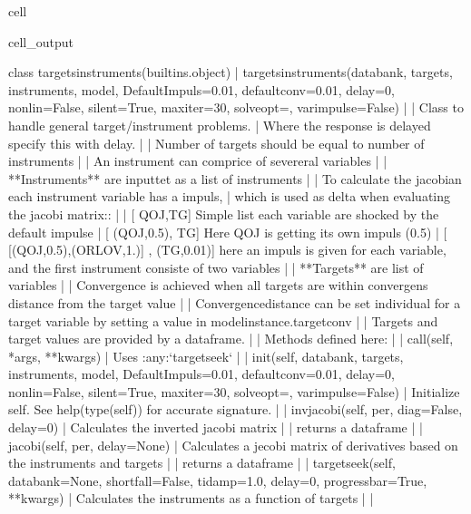 \documentclass[letterpaper,10pt,english]{jupyterBook}
\begin{document}
\begin{sphinxuseclass}{cell}
\begin{sphinxVerbatimOutput}
\begin{sphinxuseclass}{cell_output}
\begin{sphinxVerbatim}[commandchars=\\\{\}]
class targets\PYGZus{}instruments(builtins.object)
 |  targets\PYGZus{}instruments(databank, targets, instruments, model, DefaultImpuls=0.01, defaultconv=0.01, delay=0, nonlin=False, silent=True, maxiter=30, solveopt=\PYGZob{}\PYGZcb{}, varimpulse=False)
 |  
 |  Class to handle general target/instrument problems. 
 |  Where the response is delayed specify this with delay.
 |  
 |  Number of targets should be equal to number of instruments 
 |  
 |  An instrument can comprice of severeral variables
 |  
 |  **Instruments** are inputtet as a list of instruments
 |  
 |  To calculate the jacobian each instrument variable has a impuls, 
 |  which is used as delta when evaluating the jacobi matrix:: 
 |      
 |    [ \PYGZsq{}QO\PYGZus{}J\PYGZsq{},\PYGZsq{}TG\PYGZsq{}]   Simple list each variable are shocked by the default impulse 
 |    [ (\PYGZsq{}QO\PYGZus{}J\PYGZsq{},0.5), \PYGZsq{}TG\PYGZsq{}]  Here QO\PYGZus{}J is getting its own impuls (0.5)
 |    [ [(\PYGZsq{}QO\PYGZus{}J\PYGZsq{},0.5),(\PYGZsq{}ORLOV\PYGZsq{},1.)] , (\PYGZsq{}TG\PYGZsq{},0.01)] here an impuls is given for each variable, and the first instrument consiste of two variables 
 |  
 |  **Targets** are list of variables
 |  
 |  Convergence is achieved when all targets are within convergens distance from the target value
 |  
 |  Convergencedistance can be set individual for a target variable by setting a value in \PYGZlt{}modelinstance\PYGZgt{}.targetconv 
 |  
 |  Targets and target values are provided by a dataframe.
 |  
 |  Methods defined here:
 |  
 |  \PYGZus{}\PYGZus{}call\PYGZus{}\PYGZus{}(self, *args, **kwargs)
 |      Uses :any:`targetseek`
 |  
 |  \PYGZus{}\PYGZus{}init\PYGZus{}\PYGZus{}(self, databank, targets, instruments, model, DefaultImpuls=0.01, defaultconv=0.01, delay=0, nonlin=False, silent=True, maxiter=30, solveopt=\PYGZob{}\PYGZcb{}, varimpulse=False)
 |      Initialize self.  See help(type(self)) for accurate signature.
 |  
 |  invjacobi(self, per, diag=False, delay=0)
 |      Calculates the inverted jacobi matrix
 |      
 |      returns a dataframe
 |  
 |  jacobi(self, per, delay=None)
 |      Calculates a jecobi matrix of derivatives based on the instruments and targets 
 |      
 |      returns a dataframe
 |  
 |  targetseek(self, databank=None, shortfall=False, ti\PYGZus{}damp=1.0, delay=0, progressbar=True, **kwargs)
 |      Calculates the instruments as a function of targets
 |  
 |  \PYGZhy{}\PYGZhy{}\PYGZhy{}\PYGZhy{}\PYGZhy{}\PYGZhy{}\PYGZhy{}\PYGZhy{}\PYGZhy{}\PYGZhy{}\PYGZhy{}\PYGZhy{}\PYGZhy{}\PYGZhy{}\PYGZhy{}\PYGZhy{}\PYGZhy{}\PYGZhy{}\PYGZhy{}\PYGZhy{}\PYGZhy{}\PYGZhy{}\PYGZhy{}\PYGZhy{}\PYGZhy{}\PYGZhy{}\PYGZhy{}\PYGZhy{}\PYGZhy{}\PYGZhy{}\PYGZhy{}\PYGZhy{}\PYGZhy{}\PYGZhy{}\PYGZhy{}\PYGZhy{}\PYGZhy{}\PYGZhy{}\PYGZhy{}\PYGZhy{}\PYGZhy{}\PYGZhy{}\PYGZhy{}\PYGZhy{}\PYGZhy{}\PYGZhy{}\PYGZhy{}\PYGZhy{}\PYGZhy{}\PYGZhy{}\PYGZhy{}\PYGZhy{}\PYGZhy{}\PYGZhy{}\PYGZhy{}\PYGZhy{}\PYGZhy{}\PYGZhy{}\PYGZhy{}\PYGZhy{}\PYGZhy{}\PYGZhy{}\PYGZhy{}\PYGZhy{}\PYGZhy{}\PYGZhy{}\PYGZhy{}\PYGZhy{}\PYGZhy{}\PYGZhy{}

\end{sphinxVerbatim}
\end{sphinxuseclass}
\end{sphinxVerbatimOutput}
\end{sphinxuseclass}
\end{document}
